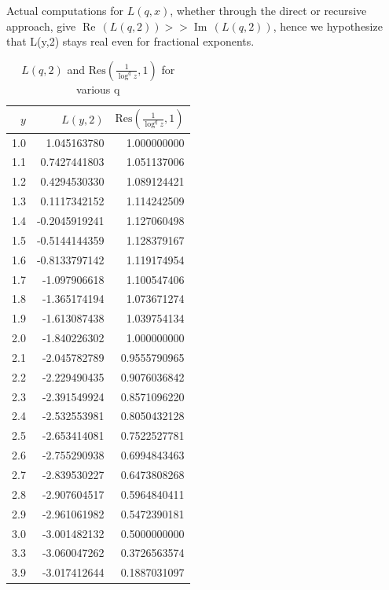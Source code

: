 \documentclass[a4paper,11pt,twoside]{amsart}
\newcommand\Res{\mathrm{Res}}
\renewcommand\Re{{\operatorname{Re\,}}}
\renewcommand\Im{{\operatorname{Im\,}}}
\begin{document}
Actual computations for $L(q,x)$, whether through the direct or recursive approach, give $\Re(L(q,2)) >> \Im(L(q,2))$,
hence we hypothesize that L(y,2) stays real even for fractional exponents.
 
\begin{table}[H]
  \begin{center}
    \begin{tabular}{r|r|r} %
      $y$ & $L(y,2)$ & $\Res\left(\frac{1}{\log^{q} z},1\right)$	\\
      \hline
      1.0 &  1.045163780 &  1.000000000\\
      1.1 &  0.7427441803 &  1.051137006\\
      1.2 &  0.4294530330 &  1.089124421\\
      1.3 &  0.1117342152 &  1.114242509\\
      1.4 &  -0.2045919241 &  1.127060498\\
      1.5 &  -0.5144144359 &  1.128379167\\
      1.6 &  -0.8133797142 &  1.119174954\\
      1.7 &  -1.097906618 &  1.100547406\\
      1.8 &  -1.365174194 &  1.073671274\\
      1.9 &  -1.613087438 &  1.039754134\\
      2.0 &  -1.840226302 &  1.000000000\\
      2.1 &  -2.045782789 &  0.9555790965\\
      2.2 &  -2.229490435 &  0.9076036842\\
      2.3 &  -2.391549924 &  0.8571096220\\
      2.4 &  -2.532553981 &  0.8050432128\\
      2.5 &  -2.653414081 &  0.7522527781\\
      2.6 &  -2.755290938 &  0.6994843463\\
      2.7 &  -2.839530227 &  0.6473808268\\
      2.8 &  -2.907604517 &  0.5964840411\\
      2.9 &  -2.961061982 & 0.5472390181\\
      3.0 &  -3.001482132 & 0.5000000000\\
      3.3 &  -3.060047262 & 0.3726563574\\
      3.9 &  -3.017412644 & 0.1887031097\\
    \end{tabular}
    \caption{$L(q,2)$ and $\Res\left(\frac{1}{\log^{q} z},1\right)$ for various q}
  \end{center}
\end{table}
\vspace{-2em}
\end{document}
